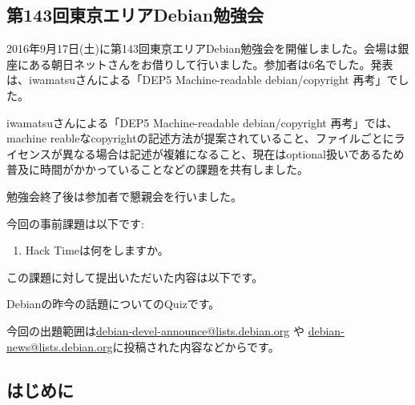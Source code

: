 \documentclass[mingoth,a4paper]{jsarticle}
\begin{document}

\subsection{第143回東京エリアDebian勉強会}

2016年9月17日(土)に第143回東京エリアDebian勉強会を開催しました。会場は銀座にある朝日ネットさんをお借りして行いました。参加者は6名でした。発表は、iwamatsuさんによる「DEP5 Machine-readable debian/copyright 再考」でした。

iwamatsuさんによる「DEP5 Machine-readable debian/copyright 再考」では、machine reableなcopyrightの記述方法が提案されていること、ファイルごとにライセンスが異なる場合は記述が複雑になること、現在はoptional扱いであるため普及に時間がかかっていることなどの課題を共有しました。

勉強会終了後は参加者で懇親会を行いました。



今回の事前課題は以下です:
\begin{enumerate}
  \item Hack Timeは何をしますか。
\end{enumerate}
この課題に対して提出いただいた内容は以下です。
\begin{multicols}{2}
{\small

}
\end{multicols}


Debianの昨今の話題についてのQuizです。

今回の出題範囲は\url{debian-devel-announce@lists.debian.org} や \url{debian-news@lists.debian.org}に投稿された内容などからです。

\begin{multicols}{2}

\end{multicols}




\subsection{はじめに}
\end{document}
